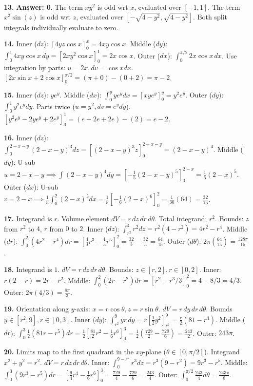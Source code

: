 \documentclass[11pt]{article}
\begin{document}
\textbf{13.} \textbf{Answer: 0}. The term $xy^2$ is odd wrt $x$, evaluated over $[-1,1]$. The term $x^2\sin(z)$ is odd wrt $z$, evaluated over $[-\sqrt{4-y^2}, \sqrt{4-y^2}]$. Both split integrals individually evaluate to zero.

\textbf{14.} Inner ($dz$): $[4yz\cos x]_0^x = 4xy \cos x$. Middle ($dy$): $\int_0^1 4xy \cos x \,dy = [2xy^2\cos x]_0^1 = 2x\cos x$.
Outer ($dx$): $\int_0^{\pi/2} 2x \cos x \,dx$. Use integration by parts: $u=2x, dv=\cos x dx$. $[2x\sin x + 2\cos x]_0^{\pi/2} = (\pi + 0) - (0 + 2) = \pi - 2$.

\textbf{15.} Inner ($dz$): $ye^y$. Middle ($dx$): $\int_0^y ye^y dx = [xye^y]_0^y = y^2e^y$.
Outer ($dy$): $\int_0^1 y^2e^y dy$. Parts twice ($u=y^2, dv=e^y dy$). $[y^2e^y - 2ye^y + 2e^y]_0^1 = (e-2e+2e) - (2) = e - 2$.

\textbf{16.} Inner ($dz$): $\int_0^{2-x-y} (2-x-y)^3 dz = [(2-x-y)^3 z]_0^{2-x-y} = (2-x-y)^4$.
Middle ($dy$): U-sub $u = 2-x-y \implies \int (2-x-y)^4 dy = [-\frac{1}{5}(2-x-y)^5]_0^{2-x} = \frac{1}{5}(2-x)^5$.
Outer ($dx$): U-sub $v = 2-x \implies \frac{1}{5} \int_0^2 (2-x)^5 dx = \frac{1}{5} [-\frac{1}{6}(2-x)^6]_0^2 = \frac{1}{30}(64) = \frac{32}{15}$.

\textbf{17.} Integrand is $r$. Volume element $dV = r\,dz\,dr\,d\theta$. Total integrand: $r^2$. Bounds: $z$ from $r^2$ to $4$, $r$ from $0$ to $2$.
Inner ($dz$): $\int_{r^2}^4 r^2 dz = r^2(4-r^2) = 4r^2 - r^4$.
Middle ($dr$): $\int_0^2 (4r^2 - r^4) dr = [\frac{4}{3}r^3 - \frac{1}{5}r^5]_0^2 = \frac{32}{3} - \frac{32}{5} = \frac{64}{15}$.
Outer ($d\theta$): $2\pi(\frac{64}{15}) = \frac{128\pi}{15}$.

\textbf{18.} Integrand is $1$. $dV = r\,dz\,dr\,d\theta$. Bounds: $z \in [r, 2], r \in [0, 2]$.
Inner: $r(2-r) = 2r - r^2$. Middle: $\int_0^2 (2r-r^2) dr = [r^2 - r^3/3]_0^2 = 4 - 8/3 = 4/3$. Outer: $2\pi(4/3) = \frac{8\pi}{3}$.

\textbf{19.} Orientation along $y$-axis: $x = r\cos\theta, z = r\sin\theta$. $dV = r \,dy\,dr\,d\theta$. Bounds $y \in [r^2, 9], r \in [0,3]$.
Inner ($dy$): $\int_{r^2}^9 yr \,dy = r[\frac{1}{2}y^2]_{r^2}^9 = \frac{r}{2}(81 - r^4)$.
Middle ($dr$): $\int_0^3 \frac{1}{2}(81r - r^5) dr = \frac{1}{2}[\frac{81}{2}r^2 - \frac{1}{6}r^6]_0^3 = \frac{1}{2}(\frac{729}{2} - \frac{729}{6}) = \frac{243}{2}$. Outer: $243\pi$.

\textbf{20.} Limits map to the first quadrant in the $xy$-plane ($\theta \in [0, \pi/2]$). Integrand $x^2+y^2 = r^2$. $dV = r \,dz\,dr\,d\theta$.
Inner: $\int_0^{9-r^2} r^3 dz = r^3(9-r^2) = 9r^3 - r^5$.
Middle: $\int_0^3 (9r^3 - r^5) dr = [\frac{9}{4}r^4 - \frac{1}{6}r^6]_0^3 = \frac{729}{4} - \frac{729}{6} = \frac{243}{4}$.
Outer: $\int_0^{\pi/2} \frac{243}{4} d\theta = \frac{243\pi}{8}$.
\end{document}
